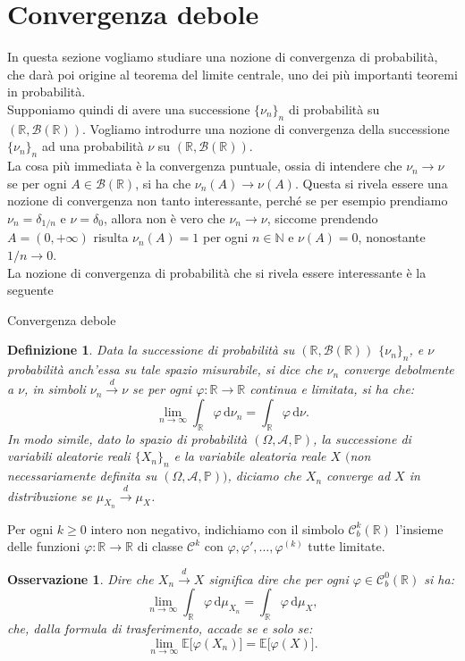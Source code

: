\documentclass[11pt]{book}
\theoremstyle{Definizione}
\newtheorem*{mydef}{Definizione}
\theoremstyle{TeoremaProposizioneLemmaCorollario}
\theoremstyle{OsservazioneNota}
\newtheorem{myobs}{Osservazione}[section]
\newcommand{\R}{\mathbb{R}}
\newcommand{\N}{\mathbb{N}}
\renewcommand{\P}{\mathbb{P}}
\renewcommand{\d}{\mathrm{d}}
\newcommand{\E}{\mathbb{E}}
\newcommand{\tod}{\overset{d}{\to}}
\begin{document}
\section{Convergenza debole}
In questa sezione vogliamo studiare una nozione di convergenza di probabilità, che darà poi origine al teorema del limite centrale, uno dei più importanti teoremi in probabilità.\\
Supponiamo quindi di avere una successione $\{\nu_n\}_n$ di probabilità su $(\R,\mathcal{B}(\R))$. Vogliamo introdurre una nozione di convergenza della successione $\{\nu_n\}_n$ ad una probabilità $\nu$ su $(\R,\mathcal{B}(\R))$.\\
La cosa più immediata è la convergenza puntuale, ossia di intendere che $\nu_n \to \nu$ se per ogni $A\in \mathcal{B}(\R)$, si ha che $\nu_n(A) \longrightarrow \nu(A)$. Questa si rivela essere una nozione di convergenza non tanto interessante, perché se per esempio prendiamo $\nu_n = \delta_{1/n}$ e $\nu = \delta_0$, allora non è vero che $\nu_n \to \nu$, siccome prendendo $A = (0,+\infty)$ risulta $\nu_n(A) = 1$ per ogni $n\in \N$ e $\nu(A) = 0$, nonostante $1/n \to 0$.\\
La nozione di convergenza di probabilità che si rivela essere interessante è la seguente
\begin{boxdef}{Convergenza debole}
\begin{mydef}
Data la successione di probabilità su $(\R,\mathcal{B}(\R))$ $\{\nu_n\}_n$, e $\nu$ probabilità anch'essa su tale spazio misurabile, si dice che $\nu_n$ converge debolmente a $\nu$, in simboli $\nu_n \tod \nu$ se per ogni $\varphi:\R \longrightarrow \R$ continua e limitata, si ha che:
$$
\lim_{n \to \infty} \int_\R \varphi \, \d \nu_n = \int_\R \varphi \,\d\nu.
$$
In modo simile, dato lo spazio di probabilità $(\Omega,\mathcal{A},\P)$, la successione di variabili aleatorie reali $\{X_n\}_n$ e la variabile aleatoria reale $X$ $($non necessariamente definita su $(\Omega,\mathcal{A},\P))$, diciamo che $X_n$ converge ad $X$ in distribuzione se $\mu_{X_n} \tod \mu_X$.
\end{mydef}
\end{boxdef}
\noindent
Per ogni $k\geq 0$ intero non negativo, indichiamo con il simbolo $\mathcal{C}_b^k(\R)$ l'insieme delle funzioni $\varphi:\R\longrightarrow \R$ di classe $\mathcal{C}^k$ con $\varphi,\varphi',\dots,\varphi^{(k)}$ tutte limitate.
\begin{myobs}
Dire che $X_n \tod X$ significa dire che per ogni $\varphi \in \mathcal{C}_b^0(\R)$ si ha:
$$
\lim_{n \to \infty} \int_\R \varphi \, \d \mu_{X_n} = \int_\R \varphi \, \d \mu_{X},
$$
che, dalla formula di trasferimento, accade se e solo se:
$$
\lim_{n\to \infty} \E\big[\varphi(X_n)\big] = \E\big[\varphi(X)\big].
$$
\end{myobs}
\end{document}
